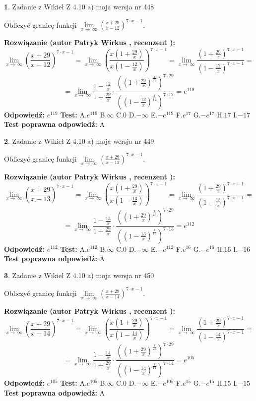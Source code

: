 \documentclass[12pt, a4paper]{article}
\theoremstyle{definition} %
\newtheorem{zad}{}
\newcommand{\zadStart}[1]{\begin{zad}#1\newline}
\newcommand{\zadStop}{\end{zad}}
\newcommand{\rozwStart}[2]{\noindent \textbf{Rozwiązanie (autor #1 , recenzent #2): }\newline}
\newcommand{\rozwStop}{\newline}
\newcommand{\odpStart}{\noindent \textbf{Odpowiedź:}\newline}
\newcommand{\odpStop}{\newline}
\newcommand{\testStart}{\noindent \textbf{Test:}\newline}
\newcommand{\testStop}{\newline}
\newcommand{\kluczStart}{\noindent \textbf{Test poprawna odpowiedź:}\newline}
\newcommand{\kluczStop}{\newline}
\begin{document}
\zadStart{Zadanie z Wikieł Z 4.10 a) moja wersja nr 448}

Obliczyć granicę funkcji  $\lim\limits_{x\to\ \infty}(\frac{x+29}{x-12})^{7\cdot x-1}$.
\zadStop
\rozwStart{Patryk Wirkus}{}
$$\lim\limits_{x\to\ \infty}(\frac{x+29}{x-12})^{7\cdot x-1} = \lim\limits_{x\to\ \infty}(\frac{x(1+\frac{29}{x})}{x(1-\frac{12}{x})})^{7\cdot x-1}=\lim\limits_{x\to\ \infty}\frac{(1+\frac{29}{x})^{7\cdot x-1}}{(1-\frac{12}{x})^{7\cdot x-1}}=$$
$$=\lim\limits_{x\to\ \infty}\frac{1-\frac{12}{x}}{1+\frac{29}{x}}\cdot\frac{((1+\frac{29}{x})^{\frac{x}{29}})^{7\cdot29}}{((1-\frac{12}{x})^{\frac{x}{12}})^{7\cdot12}}=e^{119}$$
\rozwStop
\odpStart
$e^{119}$
\odpStop
\testStart
A.$e^{119}$ B.$\infty$ C.$0$ D.$-\infty$ E.$-e^{119}$
F.$e^{17}$ G.$-e^{17}$
H.$17$
I.$-17$
\testStop
\kluczStart
A
\kluczStop



\zadStart{Zadanie z Wikieł Z 4.10 a) moja wersja nr 449}

Obliczyć granicę funkcji  $\lim\limits_{x\to\ \infty}(\frac{x+29}{x-13})^{7\cdot x-1}$.
\zadStop
\rozwStart{Patryk Wirkus}{}
$$\lim\limits_{x\to\ \infty}(\frac{x+29}{x-13})^{7\cdot x-1} = \lim\limits_{x\to\ \infty}(\frac{x(1+\frac{29}{x})}{x(1-\frac{13}{x})})^{7\cdot x-1}=\lim\limits_{x\to\ \infty}\frac{(1+\frac{29}{x})^{7\cdot x-1}}{(1-\frac{13}{x})^{7\cdot x-1}}=$$
$$=\lim\limits_{x\to\ \infty}\frac{1-\frac{13}{x}}{1+\frac{29}{x}}\cdot\frac{((1+\frac{29}{x})^{\frac{x}{29}})^{7\cdot29}}{((1-\frac{13}{x})^{\frac{x}{13}})^{7\cdot13}}=e^{112}$$
\rozwStop
\odpStart
$e^{112}$
\odpStop
\testStart
A.$e^{112}$ B.$\infty$ C.$0$ D.$-\infty$ E.$-e^{112}$
F.$e^{16}$ G.$-e^{16}$
H.$16$
I.$-16$
\testStop
\kluczStart
A
\kluczStop



\zadStart{Zadanie z Wikieł Z 4.10 a) moja wersja nr 450}

Obliczyć granicę funkcji  $\lim\limits_{x\to\ \infty}(\frac{x+29}{x-14})^{7\cdot x-1}$.
\zadStop
\rozwStart{Patryk Wirkus}{}
$$\lim\limits_{x\to\ \infty}(\frac{x+29}{x-14})^{7\cdot x-1} = \lim\limits_{x\to\ \infty}(\frac{x(1+\frac{29}{x})}{x(1-\frac{14}{x})})^{7\cdot x-1}=\lim\limits_{x\to\ \infty}\frac{(1+\frac{29}{x})^{7\cdot x-1}}{(1-\frac{14}{x})^{7\cdot x-1}}=$$
$$=\lim\limits_{x\to\ \infty}\frac{1-\frac{14}{x}}{1+\frac{29}{x}}\cdot\frac{((1+\frac{29}{x})^{\frac{x}{29}})^{7\cdot29}}{((1-\frac{14}{x})^{\frac{x}{14}})^{7\cdot14}}=e^{105}$$
\rozwStop
\odpStart
$e^{105}$
\odpStop
\testStart
A.$e^{105}$ B.$\infty$ C.$0$ D.$-\infty$ E.$-e^{105}$
F.$e^{15}$ G.$-e^{15}$
H.$15$
I.$-15$
\testStop
\kluczStart
A
\kluczStop
\end{document}
